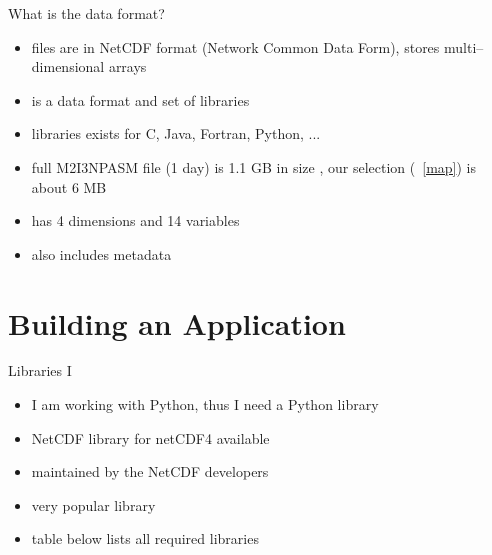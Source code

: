 \documentclass[
    hyperref={
        final,
        colorlinks=true,
        menucolor=black,
        anchorcolor=green,
        linkcolor=blue,
        citecolor=red,
        pdftitle={RS RAS Internship Presentation},
        pdfauthor={Moritz M. Konarski}
    }
]{beamer}
\newcommand{\figref}[1]{\figurename~\ref{#1}}
\begin{document}
\begin{frame}{What is the data format?}
    \begin{itemize}
        \item files are in NetCDF format (Network Common Data Form), stores
            multi--dimensional arrays
        \item is a data format and set of libraries \cite{netcdf}
        \item libraries exists for C, Java, Fortran, Python, ... 
            \cite{netcdf-facts}
        \item full M2I3NPASM file (1 day) is 1.1 GB in size \cite{data-readme},
            our selection (\figref{map}) is about $6$ MB
        \item has 4 dimensions and 14 variables
        \item also includes metadata
    \end{itemize}
\end{frame}

\section{Building an Application}

\begin{frame}{Libraries I}
    \begin{itemize}
        \item I am working with Python, thus I need a Python library
        \item NetCDF library for netCDF4 available \cite{netcdf4}
        \item maintained by the NetCDF developers
        \item very popular library
        \item table below lists all required libraries
    \end{itemize}
\end{frame}
\end{document}
